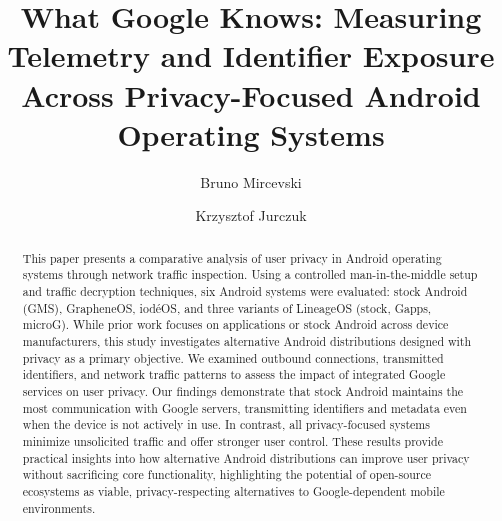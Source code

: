 \documentclass[runningheads]{llncs}
\begin{document}
\title{What Google Knows: Measuring Telemetry and Identifier Exposure Across Privacy-Focused Android Operating Systems}


\author{Bruno Mircevski \and
Krzysztof Jurczuk}



\maketitle

\begin{abstract}
This paper presents a comparative analysis of user privacy in Android operating systems through network traffic inspection. Using a controlled man-in-the-middle setup and traffic decryption techniques, six Android systems were evaluated: stock Android (GMS), GrapheneOS, iod\'eOS, and three variants of LineageOS (stock, Gapps, microG). While prior work focuses on applications or stock Android across device manufacturers, this study investigates alternative Android distributions designed with privacy as a primary objective. We examined outbound connections, transmitted identifiers, and network traffic patterns to assess the impact of integrated Google services on user privacy. Our findings demonstrate that stock Android maintains the most communication with Google servers, transmitting identifiers and metadata even when the device is not actively in use. In contrast, all privacy-focused systems minimize unsolicited traffic and offer stronger user control. These results provide practical insights into how alternative Android distributions can improve user privacy without sacrificing core functionality, highlighting the potential of open-source ecosystems as viable, privacy-respecting alternatives to Google-dependent mobile environments.

\end{abstract}










\end{document}

